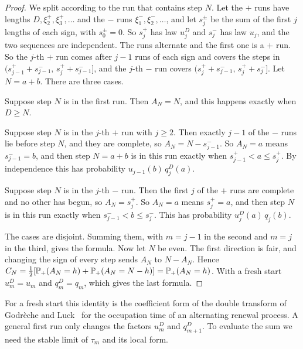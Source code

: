 \begin{proof}
We split according to the run that contains step $N$. Let the $+$ runs have
lengths $D,\xi^+_2,\xi^+_3,\dots$ and the $-$ runs
$\xi^-_1,\xi^-_2,\dots$, and let $s^\pm_j$ be the sum of the first $j$ lengths
of each sign, with $s^\pm_0=0$. So $s^+_j$ has law $u^D_j$ and $s^-_j$ has law
$u_j$, and the two sequences are independent. The runs alternate and the
first one is a $+$ run. So the $j$-th $+$ run comes after $j-1$ runs of each
sign and covers the steps in $(s^+_{j-1}+s^-_{j-1},\,s^+_j+s^-_{j-1}]$, and
the $j$-th $-$ run covers $(s^+_j+s^-_{j-1},\,s^+_j+s^-_j]$. Let $N=a+b$.
There are three cases.

Suppose step $N$ is in the first run. Then $A_N=N$, and this happens exactly
when $D\ge N$.

Suppose step $N$ is in the $j$-th $+$ run with $j\ge2$. Then exactly $j-1$ of
the $-$ runs lie before step $N$, and they are complete, so
$A_N=N-s^-_{j-1}$. So $A_N=a$ means $s^-_{j-1}=b$, and then step $N=a+b$ is
in this run exactly when $s^+_{j-1}<a\le s^+_j$. By independence this has
probability $u_{j-1}(b)\,q^D_j(a)$.

Suppose step $N$ is in the $j$-th $-$ run. Then the first $j$ of the $+$ runs
are complete and no other has begun, so $A_N=s^+_j$. So $A_N=a$ means
$s^+_j=a$, and then step $N$ is in this run exactly when
$s^-_{j-1}<b\le s^-_j$. This has probability $u^D_j(a)\,q_j(b)$.

The cases are disjoint. Summing them, with $m=j-1$ in the second and $m=j$ in
the third, gives the formula. Now let $N$ be even. The first direction is
fair, and changing the sign of every step sends $A_N$ to $N-A_N$. Hence
$C_N=\frac12[\mathbb{P}_+(A_N=h)+\mathbb{P}_+(A_N=N-h)]=\mathbb{P}_+(A_N=h)$. With a fresh
start $u^D_m=u_m$ and $q^D_m=q_m$, which gives the last formula.
\end{proof}

For a fresh start this identity is the coefficient form of the double transform of Godr\`eche
and Luck~\cite[Section~7]{godrecheluck2001} for the occupation time of an
alternating renewal process. A general first run only changes the factors
$u^D_m$ and $q^D_{m+1}$. To evaluate the sum we need the stable limit of
$\tau_m$ and its local form.

